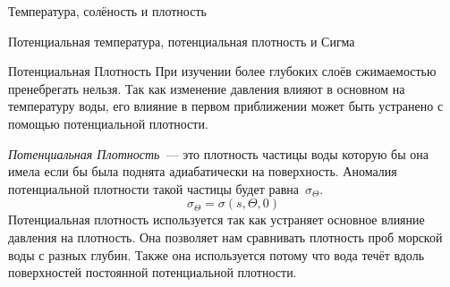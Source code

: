 \begin{chapter}{Температура, солёность и плотность}
\begin{section}{Потенциальная температура, потенциальная плотность и Сигма}
\begin{paragraph}{Потенциальная Плотность}
При изучении более глубоких слоёв сжимаемостью пренебрегать
нельзя. Так как изменение давления влияют в основном на температуру
воды, его влияние в первом приближении может быть устранено с помощью
потенциальной плотности.
%

\textit{Потенциальная Плотность}~--- это плотность частицы воды
которую бы она имела если бы была поднята адиабатически на
поверхность. Аномалия потенциальной плотности такой частицы будет
равна~$\sigma_\Theta$.
\begin{equation}
\sigma_\Theta = \sigma(s,\Theta,0)
\end{equation}
Потенциальная плотность используется так как устраняет основное
влияние давления на плотность. Она позволяет нам сравнивать плотность
проб морской воды с разных глубин. Также она используется потому что
вода течёт вдоль поверхностей постоянной потенциальной плотности.
%


\end{paragraph}
\end{section}
\end{chapter}
